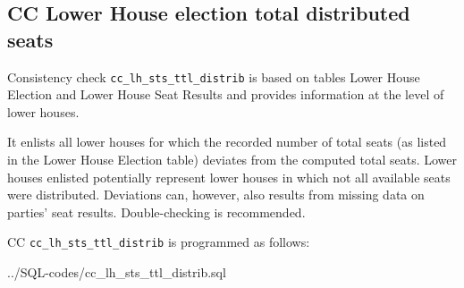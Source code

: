 \subsection{CC Lower House election total distributed seats}\label{subsec_cc_lh_sts_ttl_distrib}
Consistency check \texttt{\footnotesize cc\_lh\_sts\_ttl\_distrib} is based on tables Lower House Election and Lower House Seat Results and provides information at the level of lower houses.

It enlists all lower houses for which the recorded number of total seats (as listed in the Lower House Election table) deviates from the computed total seats. Lower houses  enlisted potentially represent lower houses in which not all available seats were distributed. Deviations can, however, also results from missing data on parties' seat results. Double-checking is recommended.

CC \texttt{\footnotesize cc\_lh\_sts\_ttl\_distrib} is programmed as follows:

%
{../SQL-codes/cc_lh_sts_ttl_distrib.sql}
